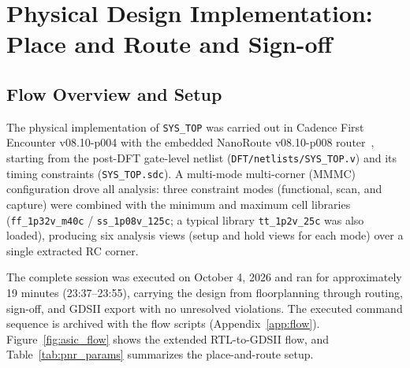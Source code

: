 \documentclass[11pt,a4paper]{article}
\begin{document}
\section{Physical Design Implementation: Place and Route and Sign-off}
\label{sec:pnr}

\subsection{Flow Overview and Setup}
The physical implementation of \texttt{SYS\_TOP} was carried out in Cadence First Encounter v08.10-p004 with the embedded NanoRoute v08.10-p008 router~\cite{cadence_encounter}, starting from the post-DFT gate-level netlist (\texttt{DFT/netlists/SYS\_TOP.v}) and its timing constraints (\texttt{SYS\_TOP.sdc}). A multi-mode multi-corner (MMMC) configuration drove all analysis: three constraint modes (functional, scan, and capture) were combined with the minimum and maximum cell libraries (\texttt{ff\_1p32v\_m40c} / \texttt{ss\_1p08v\_125c}; a typical library \texttt{tt\_1p2v\_25c} was also loaded), producing six analysis views (setup and hold views for each mode) over a single extracted RC corner.

The complete session was executed on October 4, 2026 and ran for approximately 19 minutes (23:37--23:55), carrying the design from floorplanning through routing, sign-off, and GDSII export with no unresolved violations. The executed command sequence is archived with the flow scripts (Appendix~\ref{app:flow}). Figure~\ref{fig:asic_flow} shows the extended RTL-to-GDSII flow, and Table~\ref{tab:pnr_params} summarizes the place-and-route setup.
\end{document}
